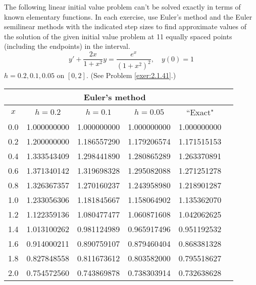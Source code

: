 \documentclass{ximera}
\begin{document}
\begin{problem}\label{exer:3.1.18} The following linear initial value problem can't be solved exactly in terms of known elementary functions. In each exercise, use
Euler's method and the Euler semilinear methods
with the indicated step sizes to find approximate values of the
solution of the given initial value problem at 11 equally spaced
points (including the endpoints) in the interval.
$$y'+\frac{2x}{1+x^2}y=\frac{e^x}{(1+x^2)^2}, \quad y(0)=1$$
$h=0.2,0.1,0.05$ on $[0,2]$. (See Problem \ref{exer:2.1.41}.)



\begin{solution}
    {\small
\begin{tabular}{|c|r|r|r|r|r|}
\hline
\multicolumn{5}{|c|}{Euler's method}\\\hline
\multicolumn{1}{|c|}{$x$}&
\multicolumn{1}{|c|}{$h=0.2$}&
\multicolumn{1}{|c|}{$h=0.1$}&
\multicolumn{1}{|c|}{$h=0.05$}&
\multicolumn{1}{|c|}{``Exact"}\\ \hline
0.0 & 1.000000000 & 1.000000000 & 1.000000000 & 1.000000000 \\
0.2 & 1.200000000 & 1.186557290 & 1.179206574 & 1.171515153 \\
0.4 & 1.333543409 & 1.298441890 & 1.280865289 & 1.263370891 \\
0.6 & 1.371340142 & 1.319698328 & 1.295082088 & 1.271251278 \\
0.8 & 1.326367357 & 1.270160237 & 1.243958980 & 1.218901287 \\
1.0 & 1.233056306 & 1.181845667 & 1.158064902 & 1.135362070 \\
1.2 & 1.122359136 & 1.080477477 & 1.060871608 & 1.042062625 \\
1.4 & 1.013100262 & 0.981124989 & 0.965917496 & 0.951192532 \\
1.6 & 0.914000211 & 0.890759107 & 0.879460404 & 0.868381328 \\
1.8 & 0.827848558 & 0.811673612 & 0.803582000 & 0.795518627 \\
2.0 & 0.754572560 & 0.743869878 & 0.738303914 & 0.732638628 \\
\hline
\end{tabular}}


\end{solution}
\end{problem}
\end{document}
